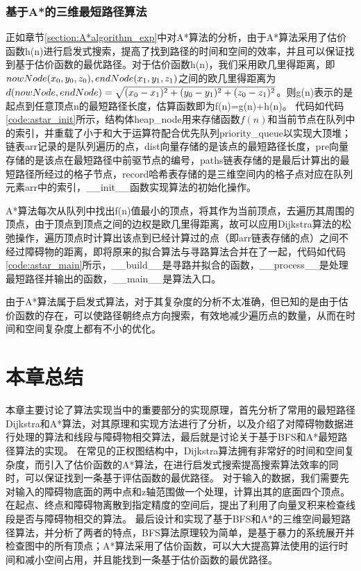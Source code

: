 \subsubsection{基于A*的三维最短路径算法}
\par 正如章节\ref{section:A*algorithm_exp}中对A*算法的分析，由于A*算法采用了估价函数h(n)进行启发式搜索，提高了找到路径的时间和空间的效率，并且可以保证找到基于估价函数的最优路径。对于估价函数h(n)，我们采用欧几里得距离，即$nowNode(x_0,y_0,z_0),\\endNode(x_1,y_1,z_1)$之间的欧几里得距离为$d(nowNode,endNode)=\\\sqrt{(x_0-x_1)^2+(y_0-y_1)^2+(z_0-z_1)^2}$。则g(n)表示的是起点到任意顶点n的最短路径长度，估算函数即为f(n)=g(n)+h(n)。
代码如代码\ref{code:astar_init}所示，结构体heap\_node用来存储函数$f(n)$和当前节点在队列中的索引，并重载了小于和大于运算符配合优先队列priority\_queue以实现大顶堆；链表arr记录的是队列遍历的点，dist向量存储的是该点的最短路径长度，pre向量存储的是该点在最短路径中前驱节点的编号，paths链表存储的是最后计算出的最短路径所经过的格子节点，record哈希表存储的是三维空间内的格子点对应在队列元素arr中的索引，\_\_init\_\_函数实现算法的初始化操作。

A*算法每次从队列中找出f(n)值最小的顶点，将其作为当前顶点，去遍历其周围的顶点，由于顶点到顶点之间的边权是欧几里得距离，故可以应用Dijkstra算法的松弛操作，遍历顶点时计算出该点到已经计算过的点（即arr链表存储的点）之间不经过障碍物的距离，即将原来的拟合算法与寻路算法合并在了一起，代码如代码\ref{code:astar_main}所示，\_\_build\_\_是寻路并拟合的函数，\_\_process\_\_是处理最短路径并输出的函数，\_\_main\_\_是算法入口。

\par 由于A*算法属于启发式算法，对于其复杂度的分析不太准确，但已知的是由于估价函数的存在，可以使路径朝终点方向搜索，有效地减少遍历点的数量，从而在时间和空间复杂度上都有不小的优化。

\section{本章总结}
\par{\kaishu 本章主要讨论了算法实现当中的重要部分的实现原理，首先分析了常用的最短路径Dijkstra和A*算法，对其原理和实现方法进行了分析，以及介绍了对障碍物数据进行处理的算法和线段与障碍物相交算法，最后就是讨论关于基于BFS和A*最短路径算法的实现。
在常见的正权图结构中，Dijkstra算法拥有非常好的时间和空间复杂度，而引入了估价函数的A*算法，在进行启发式搜索提高搜索算法效率的同时，可以保证找到一条基于评估函数的最优路径。
对于输入的数据，我们需要先对输入的障碍物底面的两中点和z轴范围做一个处理，计算出其的底面四个顶点。在起点、终点和障碍物离散到指定精度的空间后，提出了利用了向量叉积来检查线段是否与障碍物相交的算法。
最后设计和实现了基于BFS和A*的三维空间最短路径算法，并分析了两者的特点，BFS算法原理较为简单，是基于暴力的系统展开并检查图中的所有顶点；A*算法采用了估价函数，可以大大提高算法使用的运行时间和减小空间占用，并且能找到一条基于估价函数的最优路径。}